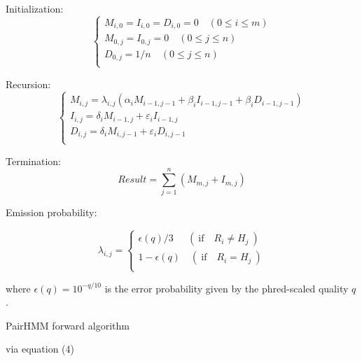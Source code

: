 \documentclass{article}
\begin{document}
\vfill

Initialization:
\begin{equation}
    \begin{cases}
    M_{i,0} = I_{i,0} = D_{i,0} = 0 \quad ( 0 \leq i \leq m ) \\
    M_{0,j} = I_{0,j} = 0 \quad ( 0 \leq j \leq n ) \\
    D_{0,j} = 1/n \quad ( 0 \leq j \leq n ) \\
    \end{cases}
\end{equation}

Recursion:
\begin{equation}
    \begin{cases}
    M_{i,j} = \lambda_{i,j}(\alpha_{i} M_{i-1,j-1} + \beta_{i} I_{i-1, j-1} + \beta_{i} D_{i-1, j-1}) \\
    I_{i,j} = \delta_{i} M_{i-1,j} + \varepsilon_{i} I_{i-1, j} \\
    D_{i,j} = \delta_{i} M_{i,j-1} + \varepsilon_{i} D_{i, j-1} \\
    \end{cases}
\end{equation}

Termination:
\begin{equation}
    Result = \sum_{j=1}^{n}(M_{m,j}+I_{m,j})
\end{equation}

\vfill

Emission probability:

\begin{equation}
    \lambda_{i,j} = \begin{cases}
    \epsilon(q)/3 \ \ \quad (\ \text{if} \quad R_{i} \neq H_{j}\ ) \\
    1 - \epsilon(q) \quad (\ \text{if} \quad R_{i} = H_{j}\ ) \\
    \end{cases}
\end{equation}

where $\epsilon(q) = 10^{-q/10}$ is the error probability given by the phred-scaled quality $q$.

\newpage

\begin{algorithm}
    \caption{PairHMM forward algorithm}\label{alg:cap}
    \begin{algorithmic}[1]
                 via equation (4)
            \EndFor
        \EndFor
        \State {}
    \end{algorithmic}
\end{algorithm}
\end{document}
